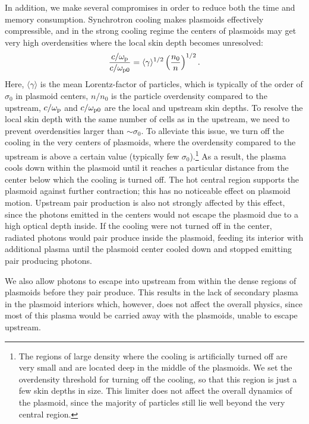 In addition, we make several compromises in order to reduce both the time and memory consumption.
Synchrotron cooling makes plasmoids effectively compressible, and in the strong cooling regime the centers of plasmoids may get very high overdensities where the local skin depth becomes unresolved:
\begin{equation}
    \frac{c/\omega_{\rm p}}{c/\omega_{\rm p0}} = \langle \gamma \rangle^{1/2} \left(\frac{n_0}{n}\right)^{1/2}.
\end{equation}
Here, $\langle \gamma \rangle$ is the mean Lorentz-factor of particles, which is typically of the order of $\sigma_0$ in plasmoid centers, $n/n_0$ is the particle overdensity compared to the upstream, $c/\omega_{\rm p}$ and $c/\omega_{\rm p0}$ are the local and upstream skin depths. To resolve the local skin depth with the same number of cells as in the upstream, we need to prevent overdensities larger than $\sim \sigma_0$. To alleviate this issue, we turn off the cooling in the very centers of plasmoids, where the overdensity compared to the upstream is above a certain value (typically few $\sigma_0$).\footnote{The regions of large density where the cooling is artificially turned off are very small and are located deep in the middle of the plasmoids. We set the overdensity threshold for turning off the cooling, so that this region is just a few skin depths in size. This limiter does not affect the overall dynamics of the plasmoid, since the majority of particles still lie well beyond the very central region.} As a result, the plasma cools down within the plasmoid until it reaches a particular distance from the center below which the cooling is turned off. The hot central region supports the plasmoid against further contraction; this has no noticeable effect on plasmoid motion. Upstream pair production is also not strongly affected by this effect, since the photons emitted in the centers would not escape the plasmoid due to a high optical depth inside. If the cooling were not turned off in the center, radiated photons would pair produce inside the plasmoid, feeding its interior with additional plasma until the plasmoid center cooled down and stopped emitting pair producing photons.

We also allow photons to escape into upstream from within the dense regions of plasmoids before they pair produce. This results in the lack of secondary plasma in the plasmoid interiors which, however, does not affect the overall physics, since most of this plasma would be carried away with the plasmoids,  unable to escape upstream.


